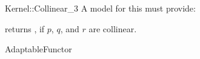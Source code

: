 \begin{ccRefFunctionObjectConcept}{Kernel::Collinear_3}
A model for this must provide:


{returns , if $p$, $q$, and $r$ are collinear.}

\ccRefines
AdaptableFunctor

\ccSeeAlso
{}  \\

\end{ccRefFunctionObjectConcept}
